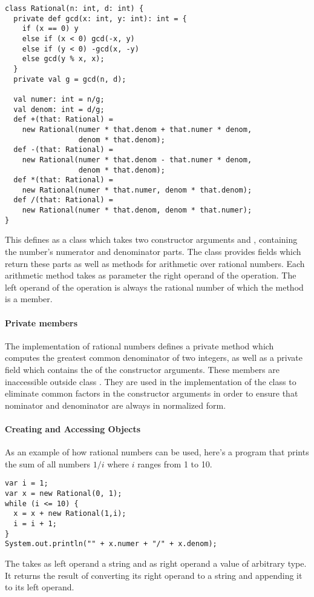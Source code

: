 \begin{lstlisting}
class Rational(n: int, d: int) {
  private def gcd(x: int, y: int): int = {
    if (x == 0) y
    else if (x < 0) gcd(-x, y)
    else if (y < 0) -gcd(x, -y)
    else gcd(y % x, x);
  }
  private val g = gcd(n, d);

  val numer: int = n/g;
  val denom: int = d/g;
  def +(that: Rational) =
    new Rational(numer * that.denom + that.numer * denom,
                 denom * that.denom);
  def -(that: Rational) =
    new Rational(numer * that.denom - that.numer * denom, 
                 denom * that.denom);
  def *(that: Rational) =
    new Rational(numer * that.numer, denom * that.denom);
  def /(that: Rational) =
    new Rational(numer * that.denom, denom * that.numer);
}
\end{lstlisting}
This defines  as a class which takes two constructor
arguments  and , containing the number's numerator and
denominator parts.  The class provides fields which return these parts
as well as methods for arithmetic over rational numbers.  Each
arithmetic method takes as parameter the right operand of the
operation. The left operand of the operation is always the rational
number of which the method is a member.

\paragraph{Private members}
The implementation of rational numbers defines a private method
 which computes the greatest common denominator of two
integers, as well as a private field  which contains the
 of the constructor arguments. These members are inaccessible
outside class . They are used in the implementation of
the class to eliminate common factors in the constructor arguments in
order to ensure that nominator and denominator are always in
normalized form.

\paragraph{Creating and Accessing Objects}
As an example of how rational numbers can be used, here's a program
that prints the sum of all numbers $1/i$ where $i$ ranges from 1 to 10.
\begin{lstlisting}
var i = 1;
var x = new Rational(0, 1);
while (i <= 10) {
  x = x + new Rational(1,i);
  i = i + 1;
}
System.out.println("" + x.numer + "/" + x.denom);
\end{lstlisting}
The \code{+} takes as left operand a string and as right operand a
value of arbitrary type. It returns the result of converting its right
operand to a string and appending it to its left operand. 
  

